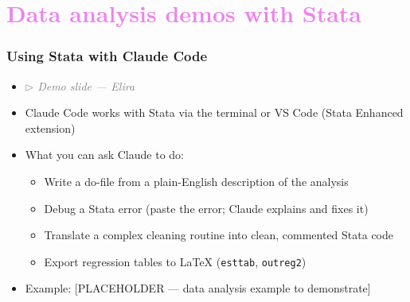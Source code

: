 \documentclass[aspectratio=169, 12pt]{beamer}
\begin{document}
\section{\textcolor{violet}{Data analysis demos with Stata \vspace{0.3in}}}


\begin{frame}
\frametitle{Using Stata with Claude Code}

\begin{itemize}
    \item \textcolor{gray}{\textit{$\triangleright$ Demo slide --- Elira}}
    \item Claude Code works with Stata via the terminal or VS Code (Stata Enhanced extension)
    \item What you can ask Claude to do:
        \begin{itemize}
            \item[$\circ$] Write a do-file from a plain-English description of the analysis
            \item[$\circ$] Debug a Stata error (paste the error; Claude explains and fixes it)
            \item[$\circ$] Translate a complex cleaning routine into clean, commented Stata code
            \item[$\circ$] Export regression tables to LaTeX (\texttt{esttab}, \texttt{outreg2})
        \end{itemize}
    \vspace{.05in}
    \item Example: [PLACEHOLDER --- data analysis example to demonstrate]
\end{itemize}

\end{frame}
\end{document}
